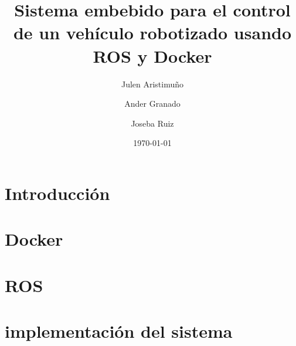 \documentclass[a4paper,12pt,oneside]{scrbook}
\title{Sistema embebido para el control de un vehículo robotizado usando ROS y Docker}
\author{Julen Aristimuño \and Ander Granado \and Joseba Ruiz}
\date{\today}
\begin{document}
\frontmatter %

\tableofcontents %
\listoffigures %


\mainmatter %
\part{Introducción}
	
	

\part{Docker}
	
	

\part{ROS}
	
	
	
\part{implementación del sistema}
	


\backmatter



\end{document}
